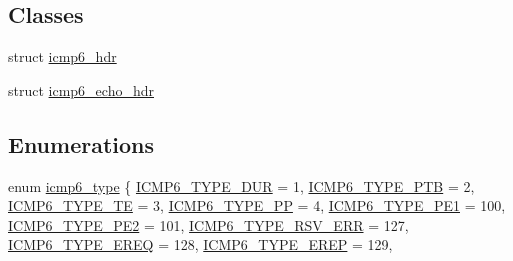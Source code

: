 \subsection*{Classes}
\begin{DoxyCompactItemize}
\item 
struct \hyperlink{structicmp6__hdr}{icmp6\+\_\+hdr}
\item 
struct \hyperlink{structicmp6__echo__hdr}{icmp6\+\_\+echo\+\_\+hdr}
\end{DoxyCompactItemize}
\subsection*{Enumerations}
\begin{DoxyCompactItemize}
\item 
enum \hyperlink{openmote-cc2538_2lwip_2src_2include_2lwip_2prot_2icmp6_8h_a6e10428d8f6102013b30013065716858}{icmp6\+\_\+type} \{ \newline
\hyperlink{native_2lwip_2src_2include_2lwip_2prot_2icmp6_8h_a6e10428d8f6102013b30013065716858aad9d4f207459e4bbd0c33a25adf6fdd7}{I\+C\+M\+P6\+\_\+\+T\+Y\+P\+E\+\_\+\+D\+UR} = 1, 
\hyperlink{native_2lwip_2src_2include_2lwip_2prot_2icmp6_8h_a6e10428d8f6102013b30013065716858a1d52ef5024a5822bd622bcb0b9da323d}{I\+C\+M\+P6\+\_\+\+T\+Y\+P\+E\+\_\+\+P\+TB} = 2, 
\hyperlink{native_2lwip_2src_2include_2lwip_2prot_2icmp6_8h_a6e10428d8f6102013b30013065716858afae9848904bc4b4b4aa716a7a9a2d7fe}{I\+C\+M\+P6\+\_\+\+T\+Y\+P\+E\+\_\+\+TE} = 3, 
\hyperlink{native_2lwip_2src_2include_2lwip_2prot_2icmp6_8h_a6e10428d8f6102013b30013065716858a63114feac8140031b74424d4a7cf6b26}{I\+C\+M\+P6\+\_\+\+T\+Y\+P\+E\+\_\+\+PP} = 4, 
\newline
\hyperlink{native_2lwip_2src_2include_2lwip_2prot_2icmp6_8h_a6e10428d8f6102013b30013065716858ac7020c08a7b03ae2a198e4a8dcd31bd4}{I\+C\+M\+P6\+\_\+\+T\+Y\+P\+E\+\_\+\+P\+E1} = 100, 
\hyperlink{native_2lwip_2src_2include_2lwip_2prot_2icmp6_8h_a6e10428d8f6102013b30013065716858aed14d280e5911098af914a94bd3ab22b}{I\+C\+M\+P6\+\_\+\+T\+Y\+P\+E\+\_\+\+P\+E2} = 101, 
\hyperlink{native_2lwip_2src_2include_2lwip_2prot_2icmp6_8h_a6e10428d8f6102013b30013065716858abe61415e020b996220337f0cd002a28f}{I\+C\+M\+P6\+\_\+\+T\+Y\+P\+E\+\_\+\+R\+S\+V\+\_\+\+E\+RR} = 127, 
\hyperlink{native_2lwip_2src_2include_2lwip_2prot_2icmp6_8h_a6e10428d8f6102013b30013065716858ae649aa45c97b885f28771688957528a3}{I\+C\+M\+P6\+\_\+\+T\+Y\+P\+E\+\_\+\+E\+R\+EQ} = 128, 
\newline
\hyperlink{native_2lwip_2src_2include_2lwip_2prot_2icmp6_8h_a6e10428d8f6102013b30013065716858ac6b91695c06bfc7fb2360310d7b8e78a}{I\+C\+M\+P6\+\_\+\+T\+Y\+P\+E\+\_\+\+E\+R\+EP} = 129, 

\end{DoxyCompactItemize}

